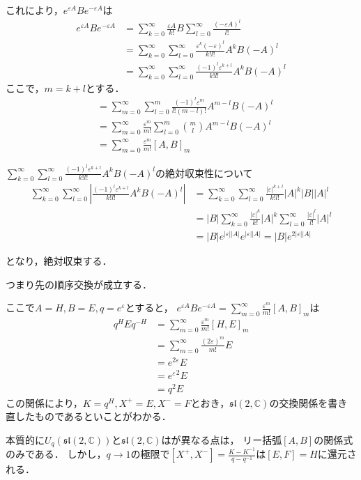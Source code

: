 \documentclass[10pt,dvipdfm]{beamer}
\newcommand{\CC}{\mathbb{C}}
\begin{document}
  \begin{frame}
    これにより，$e^{\varepsilon A}Be^{-\varepsilon A}$は
    \begin{align*}
      e^{\varepsilon A}Be^{-\varepsilon A} &= \sum_{k=0}^{\infty}\frac{\varepsilon A}{k!} B \sum_{l=0}^{\infty}\frac{(-\varepsilon A)^l}{l!} \\
      &= \sum_{k=0}^{\infty}\sum_{l=0}^{\infty}\frac{\varepsilon^k(-\varepsilon)^l}{k!l!}A^kB(-A)^l\\
      &= \sum_{k=0}^{\infty}\sum_{l=0}^{\infty}\frac{(-1)^l\varepsilon^{k+l}}{k!l!}A^kB(-A)^l
    \end{align*}
    ここで，$m=k+l$とする．
    \begin{align*}
      &= \sum_{m=0}^{\infty}\sum_{l=0}^{m}\frac{(-1)^l\varepsilon^{m}}{l!(m-l)!}A^{m-l}B(-A)^l \\
      &= \sum_{m=0}^{\infty}\frac{\varepsilon^{m}}{m!}\sum_{l=0}^{m}\binom{m}{l}A^{m-l}B(-A)^l \\
      &= \sum_{m=0}^{\infty}\frac{\varepsilon^{m}}{m!}[A,B]_m
    \end{align*}
  \end{frame}
  \begin{frame}
    $\sum_{k=0}^{\infty}\sum_{l=0}^{\infty}\frac{(-1)^l\varepsilon^{k+l}}{k!l!}A^kB(-A)^l$の絶対収束性について
    \begin{align*}
      \sum_{k=0}^{\infty}\sum_{l=0}^{\infty}\left|\frac{(-1)^l\varepsilon^{k+l}}{k!l!}A^kB(-A)^l\right| &= \sum_{k=0}^{\infty}\sum_{l=0}^{\infty}\frac{|\varepsilon|^{k+l}}{k!l!}|A|^k|B||A|^l\\
      &= |B| \sum_{k=0}^{\infty}\frac{|\varepsilon|^k}{k!}|A|^k \sum_{l=0}^{\infty}\frac{|\varepsilon|^l}{l!}|A|^l\\
      &= |B|e^{|\varepsilon||A|}e^{|\varepsilon||A|} = |B|e^{2|\varepsilon||A|}
    \end{align*}

    となり，絶対収束する．

    つまり先の順序交換が成立する．
  \end{frame}
  \begin{frame}
    ここで$A=H,B=E,q=e^{\varepsilon}$とすると，
    $e^{\varepsilon A}Be^{-\varepsilon A}=\sum_{m=0}^{\infty}\frac{\varepsilon^{m}}{m!}[A,B]_m$は
    \begin{align*}
      q^H E q^{-H} &= \sum_{m=0}^{\infty}\frac{\varepsilon^{m}}{m!}[H,E]_m\\
      &= \sum_{m=0}^{\infty}\frac{(2\varepsilon)^{m}}{m!}E\\
      &= e^{2\varepsilon}E\\
      &= {e^{\varepsilon}}^2 E\\
      &= q^2 E
    \end{align*}
    この関係により，$K = q^H,X^+=E,X^-=F$とおき，$\mathfrak{sl}(2,\CC)$の交換関係を書き直したものであるといことがわかる．

    本質的に$U_q(\mathfrak{sl}(2,\CC))$と$\mathfrak{sl}(2,\CC)$はが異なる点は，
    リー括弧$[A,B]$の関係式のみである．
    しかし，$q\to1$の極限で$[X^+,X^-]=\frac{K-K^{-1}}{q-q^{-1}}$は$[E,F]=H$に還元される．
  \end{frame}
\end{document}
